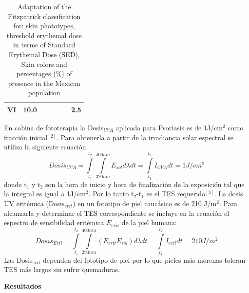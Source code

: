 \documentclass{article}
\begin{document}
\begin{multicols}{2}
\begin{center}
\begin{table}[H]
\begin{tabulary}{1.0\linewidth}{ccccccc}
        VI 	&10.0 	&	&  &	&	&2.5	\\ \hline
    \end{tabulary}
    \caption{{Adaptation of the Fitzpatrick classification for: skin phototypes,
            threshold erythemal dose in terms of Standard Erythemal Dose (SED), Skin
            colors and percentages (\%) of presence in the Mexican population
            {\label{290967}}%
    }}
    \end{table}
\end{center}
 \vspace{-0.5cm}
En cabina de fototerapia la Dosis$_{UVA}$ aplicada para Psoriasis es de 1J/cm$^2$ como fracción inicial$^{\left[2 \right]} $. Para obtenerla a partir de la irradiancia solar espectral se utiliza la siguiente ecuación:
\begin{equation*}
    Dosis_{UVA}=\int\limits_{t_1}^{t_2} \int\limits_{320nm}^{400nm} E_{sol}d\lambda dt= \int\limits_{t_1}^{t_2}I_{UVA}dt=1J/cm^2
\end{equation*}
donde t$_1$ y t$_2$ son la hora de inicio y hora de finalización de la exposición tal que la integral es igual a 1J/cm$^2$. Por lo tanto t$_2$-t$_1$ es el TES requerido$^{\left[3 \right]} $. La dosis UV eritémica (Dosis$_{erit}$) en un fototipo de piel caucásico es de 210 J/m$^2$. Para alcanzarla y determinar el TES correspondiente se incluye en la ecuación el espectro de sensibilidad eritémica $E_{erit}$ de la piel humana:
\begin{equation*}
    Dosis_{Erit}=\int\limits_{t_1}^{t_2} \int\limits_{290nm}^{400nm} \left( E_{erit}E_{sol}\right)d\lambda dt = \int\limits_{t_1}^{t_2}I_{erit}dt=210J/m^2
\end{equation*}
Las Dosis$_{erit}$ dependen del fototipo de piel por lo que pieles más morenas toleran TES más largos sin sufrir quemaduras.
\begin{center}
\begin{shaded}
\textbf{\textcolor{na}{Resultados}}
\end{shaded}
\end{center}
\vspace{-0.2cm}

\end{multicols}
\end{document}
